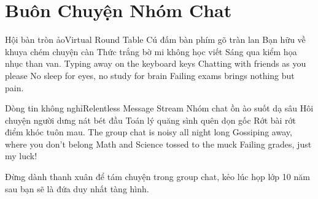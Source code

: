 \chapter{Buôn Chuyện Nhóm Chat}

\begin{tutuyetbox}{Hội bàn tròn ảo}{Virtual Round Table}
Cú đấm bàn phím gõ tràn lan
Bạn hữu về khuya chém chuyện càn
Thức trắng bờ mi không học viết
Sáng qua kiểm họa nhục than van.
\tcblower
Typing away on the keyboard keys 
Chatting with friends as you please 
No sleep for eyes, no study for brain 
Failing exams brings nothing but pain.
\end{tutuyetbox}

\begin{tutuyetbox}{Dòng tin không nghỉ}{Relentless Message Stream}
Nhóm chat ồn ào suốt dạ sâu
Hôi chuyện người dưng nát bét đầu
Toán lý quăng sình quên dọn gốc
Rớt bài rớt điểm khóc tuôn mau.
\tcblower
The group chat is noisy all night long 
Gossiping away, where you don't belong 
Math and Science tossed to the muck 
Failing grades, just my luck!
\end{tutuyetbox}

\begin{ghichu}
Đừng dành thanh xuân để tám chuyện trong group chat, kẻo lúc họp lớp 10 năm sau bạn sẽ là đứa duy nhất tàng hình.
\end{ghichu}